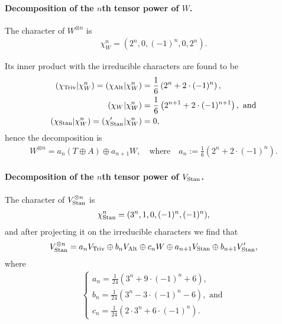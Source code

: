 {\begin{example}
	\paragraph{Decomposition of the $n$th tensor power of $W$.}	The character of $W^{\otimes n}$ is
	\begin{align*}
		\chi_{W}^n = (2^n, 0, (-1)^n, 0, 2^n).
	\end{align*}
	
	Its inner product with the irreducible characters are found to be
	\begin{align*}
		(\chi_{\text{Triv}}| \chi_{W}^n) = (\chi_{\text{Alt}} | \chi_{W}^n) &= \frac{1}{6} \left(2^n + 2 \cdot (-1)^n\right), \\
		(\chi_W | \chi_{W}^n) &= \frac{1}{6}\left(2^{n+1} + 2 \cdot (-1)^{n+1}\right), \text{ and}\\
		(\chi_{\text{Stan}} | \chi_{W}^n) = (\chi'_{\text{Stan}} | \chi_{W}^n) &= 0,
	\end{align*}
	hence the decomposition is
	\begin{align*}
		W^{\otimes n} = a_n (T \oplus A) \oplus a_{n+1} W, \quad \text{where} \quad a_n := \frac{1}{6}\left( 2^n + 2 \cdot (-1)^n \right).
	\end{align*}
	
	\paragraph{Decomposition of the $n$th tensor power of $V_{\text{Stan}}$.} The character of $V_{\text{Stan}}^{\otimes n}$ is 
	\begin{align*}
		\chi_{\text{Stan}}^n = (3^n, 1, 0, (-1)^n, (-1)^n),
	\end{align*}
	and after projecting it on the irreducible characters we find that
	\begin{align}\label{eq:nthpowerS}
		V_{\text{Stan}}^{\otimes n} = a_n V_{\text{Triv}} \oplus b_n V_{\text{Alt}} \oplus c_n W \oplus a_{n+1} V_{\text{Stan}} \oplus b_{n+1} V'_{\text{Stan}},
	\end{align}
	where 
	\begin{align*}
		\begin{cases}
			a_n = \frac{1}{24}(3^n + 9\cdot(-1)^n+6), \\
			b_n = \frac{1}{24}(3^n - 3\cdot(-1)^n -6), \text{ and} \\
			c_n = \frac{1}{24}(2\cdot 3^n + 6\cdot(-1)^n).
		\end{cases}
	\end{align*}
	

\end{example}}
